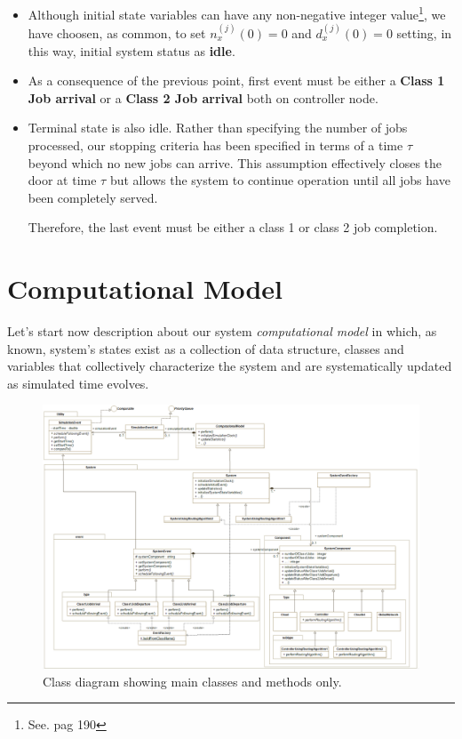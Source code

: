 \documentclass[10pt,a4paper]{article}
\begin{document}
\begin{itemize}
\item Although initial state variables can have any non-negative integer value\footnote{See. pag 190}, we have choosen, as common, to set $n_x^{(j)}(0) = 0$ and $d_x^{(j)}(0) = 0$ setting, in this way, initial system status as \textbf{idle}. 

\item As a consequence of the previous point, first event must be either a \textbf{Class 1 Job arrival} or a
\textbf{Class 2 Job arrival} both on controller node.

\item Terminal state is also idle. Rather than specifying the number of jobs processed, our stopping criteria has been specified in terms of a time $\tau$ beyond which no new jobs can arrive. This assumption effectively closes the door at time $\tau$ but allows the system to continue operation until all jobs have been completely served. 

Therefore, the last event must be either a class 1 or class 2 job completion.
\end{itemize}


\newpage
\section{Computational Model}

Let's start now description about our system \textit{computational model} in which, as known, system's states exist as a collection of data structure, classes and variables that collectively characterize the system and are systematically updated as simulated time evolves.

\begin{figure}[H]
\includegraphics[width=\textwidth]{ClassDiagram}
\centering
\caption{Class diagram showing main classes and methods only.}

\label{fig:EventClassDiagram}

\end{figure}
\end{document}
